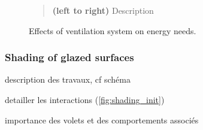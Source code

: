 \documentclass[11pt]{article}
\begin{document}
\begin{figure}[ht]
                \caption{\label{fig:ventil_init} Effects of ventilation system on energy needs.}
                \begin{quote}
                    \vspace{-2mm}
                    \small\noindent
                    \textbf{(left to right)} Description
                \end{quote}
            \end{figure}
        

        \subsubsection{Shading of glazed surfaces} %
        \label{ssub:shading_of_glazed}

        description des travaux, cf schéma 

        detailler les interactions (\ref{fig:shading_init})

        importance des volets et des comportements associés 
\end{document}
